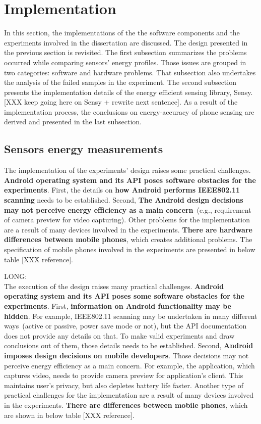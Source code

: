 \section{Implementation}
\label{s:implementation}
\hspace{10pt} In this section, the implementations of the the software components and the experiments involved in the dissertation are discussed. The design presented in the previous section is revisited. The first subsection summarizes the problems occurred while comparing sensors' energy profiles. Those issues are grouped in two categories: software and hardware problems. That subsection also undertakes the analysis of the failed samples in the experiment. The second subsection presents the implementation details of the energy efficient sensing library, Sensy. [XXX keep going here on Sensy + rewrite next sentence]. As a result of the implementation process, the conclusions on energy-accuracy of phone sensing are derived and presented in the last subsection.

\subsection{Sensors energy measurements}
The implementation of the experiments' design raises some practical challenges. \textbf{Android operating system and its API poses software obstacles for the experiments}. First, the details on \textbf{how Android performs IEEE802.11 scanning} needs to be established. Second, \textbf{
The Android design decisions may not perceive energy efficiency as a main concern}\ (e.g., requirement of camera preview for video capturing). Other problems for the implementation are a result of many devices involved in the experiments. \textbf{There are hardware differences between mobile phones},  which creates additional problems. The specification of mobile phones involved in the experiments are presented in below table [XXX reference].

LONG:\\
The execution of the design raises many practical challenges. \textbf{Android operating system and its API poses some software obstacles for the experiments}. First, \textbf{information on Android functionality may be hidden}. For example, IEEE802.11 scanning may be undertaken in many different ways\ (active or passive, power save mode or not), but the API documentation does not provide any details on that. To make valid experiments and draw conclusions out of them, those details needs to be established. Second, \textbf{Android imposes design decisions on mobile developers}. Those decisions may not perceive energy efficiency as a main concern. For example, the application, which captures video, needs to provide camera preview for application's client. This maintains user's privacy, but also depletes battery life faster. Another type of practical challenges for the implementation are a result of many devices involved in the experiments. \textbf{There are differences between mobile phones}, which are shown in below table [XXX reference].
	
